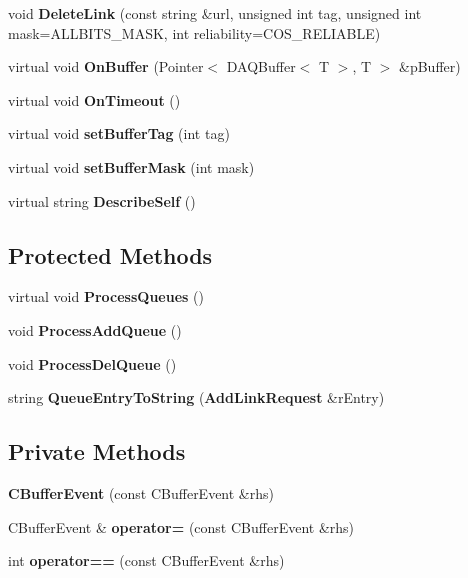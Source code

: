 \begin{CompactItemize}
\item 
void {\bf Delete\-Link} (const string \&url, unsigned int tag, unsigned int mask=ALLBITS\_\-MASK, int reliability=COS\_\-RELIABLE)
\item 
virtual void {\bf On\-Buffer} (Pointer$<$ DAQBuffer$<$ T $>$, T $>$ \&p\-Buffer)
\item 
virtual void {\bf On\-Timeout} ()
\item 
virtual void {\bf set\-Buffer\-Tag} (int tag)
\item 
virtual void {\bf set\-Buffer\-Mask} (int mask)
\item 
virtual string {\bf Describe\-Self} ()
\end{CompactItemize}
\subsection*{Protected Methods}
\begin{CompactItemize}
\item 
virtual void {\bf Process\-Queues} ()
\item 
void {\bf Process\-Add\-Queue} ()
\item 
void {\bf Process\-Del\-Queue} ()
\item 
string {\bf Queue\-Entry\-To\-String} ({\bf Add\-Link\-Request} \&r\-Entry)
\end{CompactItemize}
\subsection*{Private Methods}
\begin{CompactItemize}
\item 
{\bf CBuffer\-Event} (const CBuffer\-Event \&rhs)
\item 
CBuffer\-Event \& {\bf operator=} (const CBuffer\-Event \&rhs)
\item 
int {\bf operator==} (const CBuffer\-Event \&rhs)
\end{CompactItemize}
